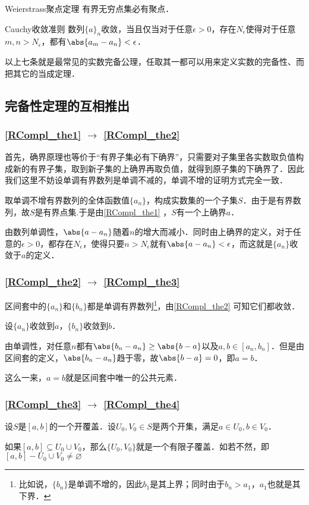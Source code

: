 \begin{theorem}{Weierstrass聚点定理}\label{RCompl_the6}
有界无穷点集必有聚点．
\end{theorem}

\begin{theorem}{Cauchy收敛准则}\label{RCompl_the7}
数列$\{a\}_n$收敛，当且仅当对于任意$\epsilon>0$，存在$N_\epsilon$使得对于任意$m, n>N_\epsilon$，都有$\abs{a_m-a_n}<\epsilon$．
\end{theorem}

以上七条就是最常见的实数完备公理，任取其一都可以用来定义实数的完备性、而把其它的当成定理．

\subsection{完备性定理的互相推出}

\subsubsection{\autoref{RCompl_the1} $\to$ \autoref{RCompl_the2} }

首先，确界原理也等价于“有界子集必有下确界”，只需要对子集里各实数取负值构成新的有界子集，取到新子集的上确界再取负值，就得到原子集的下确界了．因此我们这里不妨设单调有界数列是单调不减的，单调不增的证明方式完全一致．

取单调不增有界数列的全体函数值$\{a_n\}$，构成实数集的一个子集$S$．由于是有界数列，故$S$是有界点集.于是由\autoref{RCompl_the1} ，$S$有一个上确界$a$．

由数列单调性，$\abs{a-a_n}$随着$n$的增大而减小．同时由上确界的定义，对于任意的$\epsilon>0$，都存在$N_\epsilon$，使得只要$n>N_\epsilon$就有$\abs{a-a_n}<\epsilon$，而这就是$\{a_n\}$收敛于$a$的定义．

\subsubsection{\autoref{RCompl_the2} $\to$ \autoref{RCompl_the3} }

区间套中的$\{a_n\}$和$\{b_n\}$都是单调有界数列\footnote{比如说，$\{b_n\}$是单调不增的，因此$b_1$是其上界；同时由于$b_n>a_1$，$a_1$也就是其下界．}，由\autoref{RCompl_the2} 可知它们都收敛．

设$\{a_n\}$收敛到$a$，$\{b_n\}$收敛到$b$．

由单调性，对任意$n$都有$\abs{b_n-a_n}\geq\abs{b-a}$以及$a, b\in [a_n, b_n]$．但是由区间套的定义，$\abs{b_n-a_n}$趋于零，故$\abs{b-a}=0$，即$a=b$．

这么一来，$a=b$就是区间套中唯一的公共元素．

\subsubsection{\autoref{RCompl_the3} $\to$ \autoref{RCompl_the4} }

设$S$是$[a, b]$的一个开覆盖．设$U_0, V_0\in S$是两个开集，满足$a\in U_0, b\in V_0$．

如果$[a, b]\subseteq U_0\cup V_0$，那么$\{U_0, V_0\}$就是一个有限子覆盖．如若不然，即$[a, b]-U_0\cup V_0\neq \varnothing$


















